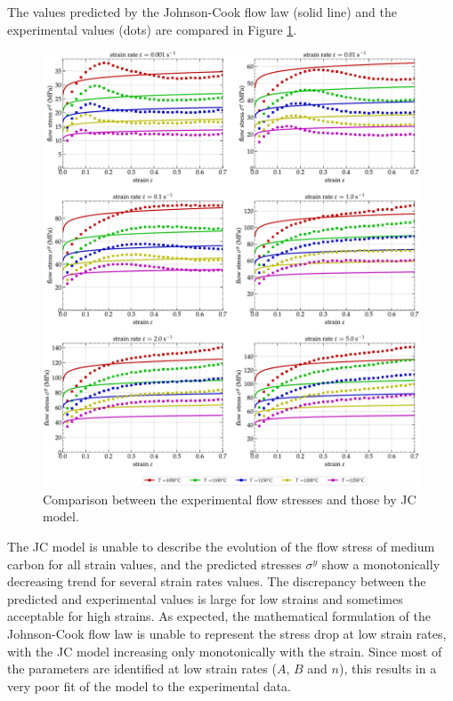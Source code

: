 \documentclass[twoside,english,1p,final,sort&compress]{elsarticle}
\theoremstyle{plain}
\begin{document}
The values predicted by the Johnson-Cook flow law (solid line) and the experimental values (dots) are compared in Figure \ref{fig:CompExp-JC-6}.
\begin{figure}[!ht]
\centering
\includegraphics[width=\columnwidth]{Figures/CompExp-JC-6}
\caption{Comparison between the experimental flow stresses and those by JC model.}
\label{fig:CompExp-JC-6}
\end{figure}
The JC model is unable to describe the evolution of the flow stress of medium carbon for all strain values, and the predicted stresses $\sigma^y$ show a monotonically decreasing trend for several strain rates values. The discrepancy between the predicted and experimental values is large for low strains and sometimes acceptable for high strains. As expected, the mathematical formulation of the Johnson-Cook flow law is unable to represent the stress drop at low strain rates, with the JC model increasing only monotonically with the strain. Since most of the parameters are identified at low strain rates ($A$, $B$ and $n$), this results in a very poor fit of the model to the experimental data.
\end{document}
